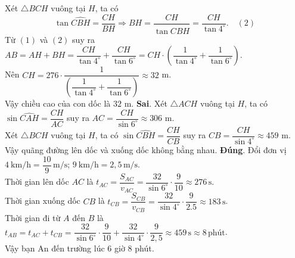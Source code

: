 \begin{ex}
{\begin{itemchoice}
	Xét $\triangle BCH$ vuông tại $H$, ta có
	$$\tan\widehat{CBH}=\dfrac{CH}{BH} \Rightarrow BH=\dfrac{CH}{\tan\widehat{CBH}}=\dfrac{CH}{\tan 4^\circ}. \quad (2)$$
	Từ $(1)$ và $(2)$ suy ra $AB = AH + BH = \dfrac{CH}{\tan 4^\circ} + \dfrac{CH}{\tan 6^\circ} = CH \cdot \left(\dfrac{1}{\tan 4^\circ} + \dfrac{1}{\tan 6^\circ}\right)$.\\
	Nên $CH = 276 \cdot \dfrac{1}{\left(\dfrac{1}{\tan 4^\circ} + \dfrac{1}{\tan 6^\circ}\right)} \approx 32$ m.\\
	Vậy chiều cao của con dốc là $32$ m. 
	\itemch \textbf{Sai}. Xét $\triangle ACH$ vuông tại $H$, ta có $\sin\widehat{CAH}=\dfrac{CH}{AC}$ suy ra $AC=\dfrac{CH}{\sin 6^\circ} \approx 306$ m.\\
	Xét $\triangle BCH$ vuông tại $H$, ta có $\sin\widehat{CBH}=\dfrac{CH}{CB}$ suy ra $CB=\dfrac{CH}{\sin 4^\circ} \approx 459$ m.\\
	Vậy quãng đường lên dốc và xuống dốc không bằng nhau. 
	\itemch \textbf{Đúng}. Đổi đơn vị $4~\mathrm{km/h}=\dfrac{10}{9}\,\mathrm{m/s}$; $9~\mathrm{km/h}=2{,}5\,\mathrm{m/s}$.\\
	Thời gian lên dốc $AC$ là $t_{AC} = \dfrac{S_{AC}}{v_{AC}} = \dfrac{32}{\sin 6^\circ} \cdot \dfrac{9}{10} \approx 276\,\mathrm{s}$.\\
	Thời gian xuống dốc $CB$ là $t_{CB} = \dfrac{S_{CB}}{v_{CB}} = \dfrac{32}{\sin 4^\circ} \cdot \dfrac{9}{2.5} \approx 183\,\mathrm{s}$.\\
	Thời gian đi từ $A$ đến $B$ là $t_{AB} = t_{AC} + t_{CB} = \dfrac{32}{\sin 6^\circ} \cdot \dfrac{9}{10} + \dfrac{32}{\sin 4^\circ} \cdot \dfrac{9}{2{,}5} \approx 459\,\mathrm{s} \approx 8 \,\text{phút}$.\\
	Vậy bạn An đến trường lúc $6$ giờ $8$ phút.
	\end{itemchoice}
	}
\end{ex}

